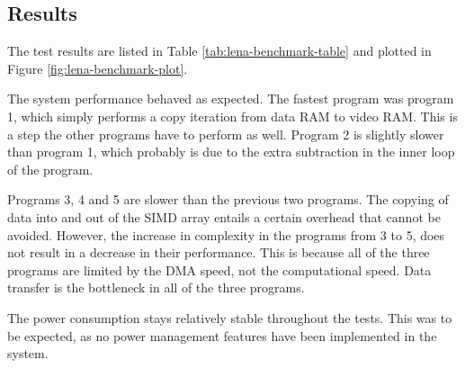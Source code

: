 \subsection{Results}

The test results are listed in Table \ref{tab:lena-benchmark-table} and
plotted in Figure \ref{fig:lena-benchmark-plot}. 




The system performance behaved as expected. The fastest program was
program 1, which simply performs a copy iteration from data RAM to video
RAM. This is a step the other programs have to perform as well. Program
2 is slightly slower than program 1, which probably is due to the extra
subtraction in the inner loop of the program.

Programs 3, 4 and 5 are slower than the previous two programs. The
copying of data into and out of the SIMD array entails a certain
overhead that cannot be avoided. However, the increase in complexity in
the programs from 3 to 5, does not result in a decrease in their
performance. This is because all of the three programs are limited by
the DMA speed, not the computational speed. Data transfer is the
bottleneck in all of the three programs.

The power consumption stays relatively stable throughout the tests. This
was to be expected, as no power management features have been
implemented in the system.
